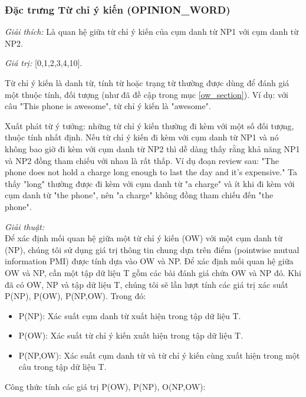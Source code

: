 \documentclass[12pt]{report}
\begin{document}
				\subsubsection*{Đặc trưng Từ chỉ ý kiến (OPINION\_WORD)}
					\par \textit{Giải thích:} Là quan hệ giữa từ chỉ ý kiến của cụm danh từ NP1 với cụm danh từ NP2.
					\par \textit{Giá trị:} [0,1,2,3,4,10]. 
					\par Từ chỉ ý kiến là danh từ, tính từ hoặc trạng từ thường được dùng để đánh giá một thuộc tính, đối tượng (như đã đề cập trong mục \ref{ow_section}). Ví dụ: với câu "This phone is awesome", từ chỉ ý kiến là "awesome".
					\par Xuất phát từ ý tưởng: những từ chỉ ý kiến thường đi kèm với một số đối tượng, thuộc tính nhất định. Nếu từ chỉ ý kiến đi kèm với cụm danh từ NP1 và nó không bao giờ đi kèm với cụm danh từ NP2 thì dễ dàng thấy rằng khả năng NP1 và NP2 đồng tham chiếu với nhau là rất thấp. Ví dụ đoạn review sau: "The phone does not hold a charge long enough to last the day and it’s expensive." Ta thấy "long" thường được đi kèm với cụm danh từ "a charge" và ít khi đi kèm với cụm danh từ "the phone", nên "a charge" không đồng tham chiếu đến "the phone".
					\par \textit{Giải thuật:}
					\\Để xác định mối quan hệ giữa một từ chỉ ý kiến (OW) với một cụm danh từ (NP), chúng tôi sử dụng giá trị thông tin chung dựa trên điểm (pointwise mutual information PMI) được tính dựa vào OW và NP. Để xác định mối quan hệ giữa OW và NP, cần một tập dữ liệu T gồm các bài đánh giá chứa OW và NP đó. Khi đã có OW, NP và tập dữ liệu T, chúng tôi sẽ lần lượt tính các giá trị xác suất P(NP), P(OW), P(NP,OW). Trong đó:
					\begin{itemize} 
						\item{P(NP): Xác suất cụm danh từ xuất hiện trong tập dữ liệu T.}
						\item{P(OW): Xác suất từ chỉ ý kiến xuất hiện trong tập dữ liệu T.}
						\item{P(NP,OW): Xác suất cụm danh từ và từ chỉ ý kiến cùng xuất hiện trong một câu trong tập dữ liệu T.}
					\end{itemize}
					\par Công thức tính các giá trị P(OW), P(NP), O(NP,OW):
\end{document}
